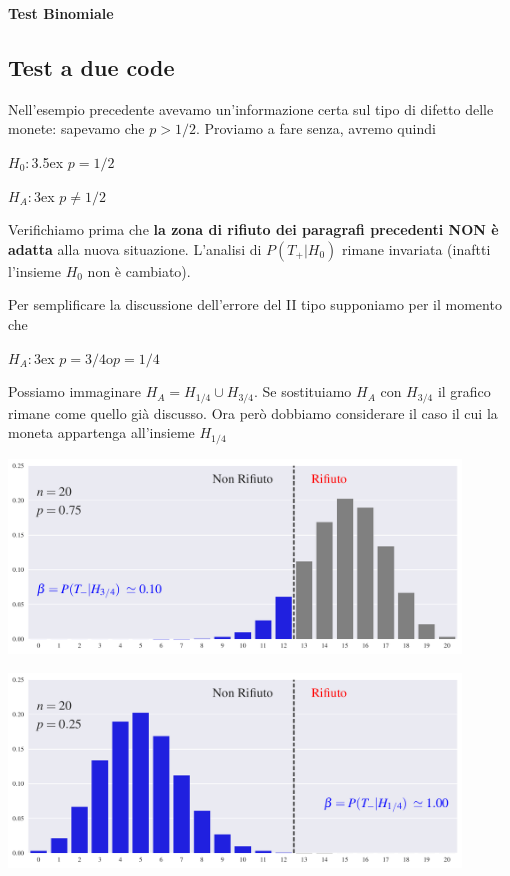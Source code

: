 \documentclass[12pt,openany]{book}
\theoremstyle{mio}
\theoremstyle{liscio}
\begin{document}
\clearpage\hfill\textbf{Test Binomiale}\subsection{Test a due code}

Nell'esempio precedente avevamo un'informazione certa sul tipo di difetto delle monete: sapevamo che $p>1/2$. Proviamo a fare senza, avremo quindi

$H_0:$\kern3.5ex $p=1/2$

$H_A:$\kern3ex $p\neq1/2$

Verifichiamo prima che  \textbf{la zona di rifiuto dei paragrafi precedenti NON è adatta\/} alla nuova situazione. L'analisi di $P(T_+|H_0)$ rimane invariata (inaftti l'insieme $H_0$ non è cambiato).

Per semplificare la discussione dell'errore del II tipo supponiamo per il momento che 

$H_A:$\kern3ex $p=3/4$\quad o\quad $p=1/4$ 

Possiamo immaginare $H_A=H_{{1/4}}\cup H_{{3/4}}$. Se sostituiamo $H_A$ con $H_{{3/4}}$ il grafico rimane come quello già discusso. Ora però dobbiamo considerare il caso il cui la moneta appartenga all'insieme $H_{{1/4}}$

\hfil\includegraphics[width=0.9\textwidth]{figure/B-test_02.pdf}

\hfil\includegraphics[width=0.9\textwidth]{figure/B-test_03.pdf}
\end{document}
